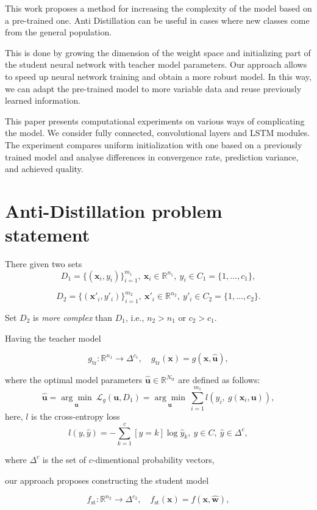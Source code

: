 \documentclass[80pt]{article}
\begin{document}
This work proposes a method for increasing the complexity of the model based on a pre-trained one. Anti Distillation can be useful in cases where new classes come from the general population. 

This is done by growing the dimension of the weight space and initializing part of the student neural network with teacher model parameters. Our approach allows to speed up neural network training and obtain a more robust model. In this way, we can adapt the pre-trained model to more variable data and reuse previously learned information.

This paper presents computational experiments on various ways of complicating the model. We consider fully connected, convolutional layers and LSTM modules. The experiment compares uniform initialization with one based on a previously trained model and analyse differences in convergence rate, prediction variance, and achieved quality.

\section{Anti-Distillation problem statement}
There given two sets
$$D_1 = \{(\mathbf{x}_i, y_i)\}_{i=1}^{m_1},~\mathbf{x}_i \in \mathbb{R}^{n_1},~y_i \in C_1 = \{1, \dots, c_1\},$$

$$D_2 =  \{(\mathbf{x}'_i, y'_i)\}_{i=1}^{m_2},~\mathbf{x}'_i \in \mathbb{R}^{n_2},~y'_i \in C_2 = \{1, \dots, c_2\}.$$

Set $D_2$ is \textit{more complex} than $D_1$, i.e., $n_2 > n_1$ or $c_2 > c_1$.

Having the teacher model 

\[g_\text{tr}: \mathbb{R}^{n_1} \rightarrow \Delta^{c_1},\quad g_\text{tr}(\mathbf{x}) = g(\mathbf{x}, \hat{\mathbf{u}}),\] 

where the optimal model parameters $\hat{\mathbf{u}} \in \mathbb{R}^{N_{\text{tr}}}$ are defined as follows:
$$\hat{\mathbf{u}} =  \underset{\mathbf{u}}{\arg\min}~\mathcal{L}_g(\mathbf{u}, D_1) =\underset{\mathbf{u}}{\arg\min}~\sum\limits_{i=1}^{m_1} l \left(y_i,~g(\mathbf{x}_i, \mathbf{u})\right),$$
here, $l$ is the cross-entropy loss 
$$l(y, \hat{y}) = -\sum\limits_{k=1}^{c} [y = k] \log{\hat{y}_k},~y \in C,~\hat{y} \in \Delta^c,$$

where $\Delta^c$ is the set of $c$-dimentional probability vectors,

our approach proposes constructing the student model

\[f_\text{st}: \mathbb{R}^{n_2} \rightarrow \Delta^{c_2},\quad f_\text{st}(\mathbf{x}) = f(\mathbf{x}, \hat{\mathbf{w}}),\]
\end{document}
